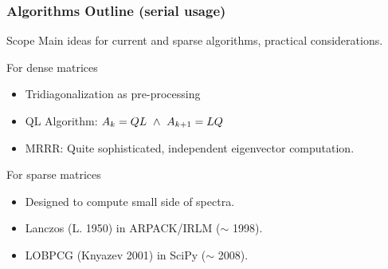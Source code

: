  \begin{frame}
  \frametitle{Algorithms Outline (serial usage)}
  \begin{block}{Scope}
    Main ideas for current and sparse algorithms, practical
    considerations. 
  \end{block}
  \begin{block}{For dense matrices}
    \begin{itemize}
      \item Tridiagonalization as pre-processing
      \item QL Algorithm: $A_k = QL \,\,\land\,\, A_{k+1} = L Q$
      \item MRRR: Quite sophisticated, independent eigenvector computation.
    \end{itemize}
  \end{block}
  \begin{block}{For sparse matrices}
    \begin{itemize}
      \item Designed to compute small side of spectra.
    \item Lanczos (L. 1950) in ARPACK/IRLM ($\sim$ 1998).
    \item LOBPCG (Knyazev 2001) in SciPy ($\sim$ 2008).
    \end{itemize}
  \end{block}
\end{frame}
